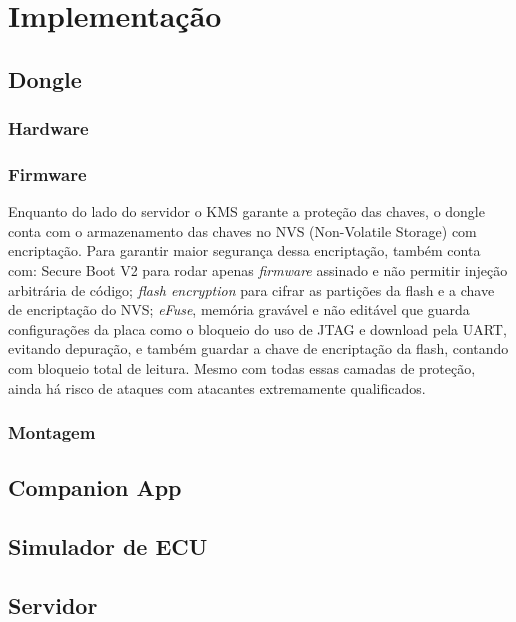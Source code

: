 \chapter{Implementação} \label{cap:implementacao}

\section{Dongle}
\subsection{Hardware}
\subsection{Firmware}

Enquanto do lado do servidor o KMS garante a proteção das chaves, o dongle conta com o armazenamento das chaves no NVS (Non-Volatile Storage) com encriptação. Para garantir maior segurança
dessa encriptação, também conta com: Secure Boot V2 para rodar apenas \textit{firmware} assinado e não permitir injeção arbitrária de código; \textit{flash encryption} para cifrar as partições
da flash e a chave de encriptação do NVS; \textit{eFuse}, memória gravável e não editável que guarda configurações da placa como o bloqueio do uso de JTAG e download pela UART, evitando depuração, 
e também guardar a chave de encriptação da flash, contando com bloqueio total de leitura. Mesmo com todas essas camadas de proteção, ainda há risco de ataques com atacantes extremamente qualificados.

\subsection{Montagem}

\section{Companion App}

\section{Simulador de ECU}

\section{Servidor}

